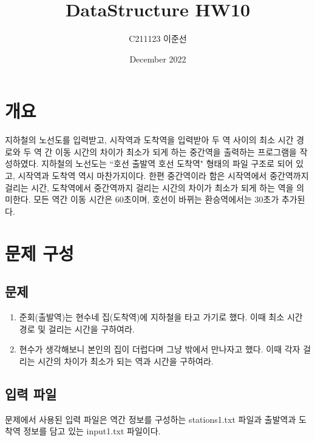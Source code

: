 \documentclass{article}
\title{DataStructure HW10}
\author{C211123 이준선}
\date{December 2022}
\begin{document}
\maketitle
\tableofcontents
\listoffigures
\lstlistoflistings
\thispagestyle{empty}
\newpage

\section{개요}
지하철의 노선도를 입력받고, 시작역과 도착역을 입력받아 두 역 사이의 최소 시간 경로와 두 역 간 이동 시간의 차이가 최소가 되게 하는 중간역을 출력하는 프로그램을 작성하였다. 지하철의 노선도는 ``호선 출발역 호선 도착역" 형태의 파일 구조로 되어 있고, 시작역과 도착역 역시 마찬가지이다. 한편 중간역이라 함은 시작역에서 중간역까지 걸리는 시간, 도착역에서 중간역까지 걸리는 시간의 차이가 최소가 되게 하는 역을 의미한다. 모든 역간 이동 시간은 60초이며, 호선이 바뀌는 환승역에서는 30초가 추가된다.

\section{문제 구성}
\subsection{문제}
\begin{enumerate} [label=(\alph*)]
    \item 준회(출발역)는 현수네 집(도착역)에 지하철을 타고 가기로 했다. 이때 최소 시간 경로 및 걸리는 시간을 구하여라.
    \item 현수가 생각해보니 본인의 집이 더럽다며 그냥 밖에서 만나자고 했다. 이때 각자 걸리는 시간의 차이가 최소가 되는 역과 시간을 구하여라.
\end{enumerate}

\subsection{입력 파일}
문제에서 사용된 입력 파일은 역간 정보를 구성하는 stations1.txt 파일과 출발역과 도착역 정보를 담고 있는 input1.txt 파일이다.
\end{document}
